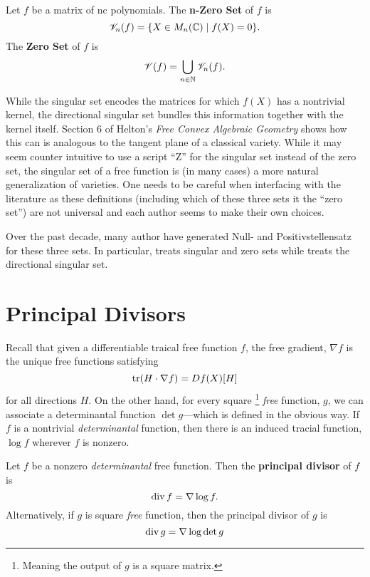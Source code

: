\begin{definition}%
\label{def:zeroset}
  Let \(f\) be a matrix of nc polynomials. The \textbf{n-Zero Set} of \(f\) is
  \[
    \mathscr{V}_n(f) = \{X \in M_n (\mathbb{C}) \mid f(X) =0\}.
  \]
  The \textbf{Zero Set} of \(f\) is
  \[
    \mathscr{V}(f) = \bigcup_{n \in \mathbb{N} } \mathscr{V}_n(f).
  \]
\end{definition}

While the singular set encodes the matrices for which \(f(X)\) has a nontrivial
kernel, the directional singular set bundles this information together with the
kernel itself. Section 6 of Helton's \emph{Free Convex Algebraic Geometry}
\cite{heltonFree2013} shows how this can is analogous to the tangent plane of a
classical variety. While it may seem counter intuitive to use a script ``Z''
for the singular set instead of the zero set, the singular set of a free
function is (in many cases) a more natural generalization of varieties.
One needs to be careful when interfacing with the literature as these
definitions (including which of these three sets it the ``zero set'') are not
universal and each author seems to make their own choices.

Over the past decade, many author have generated Null- and
Positivstellensatz for these three sets. In particular,
\cite{heltonFactorization2019} treats singular and zero sets while
\cite{heltonStrong2007} treats the directional singular set.

\section{Principal Divisors}%
\label{sec:prindiv}

Recall that given a differentiable traical free function \(f\), the free
gradient, \(\nabla f\) is the unique free functions satisfying
\[
  \operatorname{tr} (H \cdot \nabla f) = Df(X)[H]
\]
for all directions \(H\). On the other hand, for every square
\footnote{Meaning the output of \(g\) is a square matrix.}
\emph{free} function, \(g\), we can associate a determinantal function
\(\det g\)---which is defined in the obvious way. If \(f\) is a nontrivial
\emph{determinantal} function, then there is an induced tracial function,
\(\log f\) wherever \(f\) is nonzero.


\begin{definition}%
\label{def:princdiv}
Let \(f\) be a nonzero \emph{determinantal} free function. Then the
\textbf{principal divisor} of \(f\) is
\[
  \operatorname{div} f = \nabla \log f.
\]
Alternatively, if \(g\) is square \emph{free} function, then the principal divisor of
\(g\) is
\[
  \operatorname{div} g = \nabla \log \det g
\]
\end{definition}

